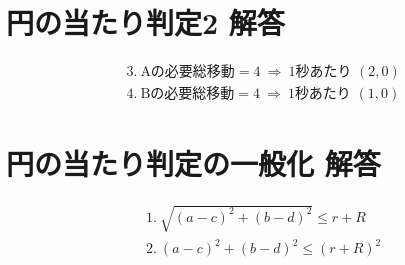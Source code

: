 \documentclass[paper=b4j,landscape,twocolumn,fleqn]{jlreq}
\begin{document}
\section{円の当たり判定2 解答}
\begin{align*}
&3.\ \text{Aの必要総移動}=4\ \Rightarrow\ 1\text{秒あたり }(2,0)\\
&4.\ \text{Bの必要総移動}=4\ \Rightarrow\ 1\text{秒あたり }(1,0)
\end{align*}

\section{円の当たり判定の一般化 解答}
\begin{align*}
&1.\ \sqrt{(a-c)^2+(b-d)^2}\le r+R\\
&2.\ (a-c)^2+(b-d)^2\le (r+R)^2
\end{align*}
\end{document}
